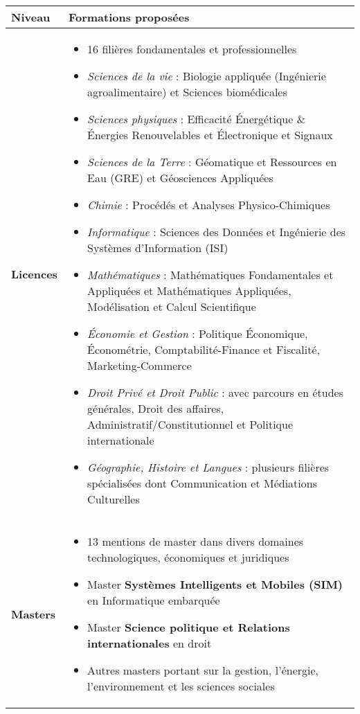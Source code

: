 \documentclass[french,12pt]{report} %
\newcommand{\headercell}[1]{\cellcolor{tableheader}\textbf{#1}}
\newcommand{\rowcol}{\rowcolor{tablerowalt}}
\begin{document}
\begin{table}[H]
\begin{mdframed}[style=tablestyle]
\centering
\begin{tabular}{p{3.5cm}p{10cm}}
\toprule
\headercell{Niveau} & \headercell{Formations proposées} \\ \midrule
\textbf{Licences} & 
\begin{itemize}\itemsep0em
    \item 16 filières fondamentales et professionnelles
    \item \textit{Sciences de la vie} : Biologie appliquée (Ingénierie agroalimentaire) et Sciences biomédicales
    \item \textit{Sciences physiques} : Efficacité Énergétique \& Énergies Renouvelables et Électronique et Signaux
    \item \textit{Sciences de la Terre} : Géomatique et Ressources en Eau (GRE) et Géosciences Appliquées
    \item \textit{Chimie} : Procédés et Analyses Physico-Chimiques
    \item \textit{Informatique} : Sciences des Données et Ingénierie des Systèmes d'Information (ISI)
    \item \textit{Mathématiques} : Mathématiques Fondamentales et Appliquées et Mathématiques Appliquées, Modélisation et Calcul Scientifique
    \item \textit{Économie et Gestion} : Politique Économique, Économétrie, Comptabilité-Finance et Fiscalité, Marketing-Commerce
    \item \textit{Droit Privé et Droit Public} : avec parcours en études générales, Droit des affaires, Administratif/Constitutionnel et Politique internationale
    \item \textit{Géographie, Histoire et Langues} : plusieurs filières spécialisées dont Communication et Médiations Culturelles
\end{itemize} \\ \midrule
\rowcol
\textbf{Masters} & 
\begin{itemize}\itemsep0em
    \item 13 mentions de master dans divers domaines technologiques, économiques et juridiques
    \item Master \textbf{Systèmes Intelligents et Mobiles (SIM)} en Informatique embarquée
    \item Master \textbf{Science politique et Relations internationales} en droit
    \item Autres masters portant sur la gestion, l'énergie, l'environnement et les sciences sociales

\end{itemize}
\end{tabular}
\end{mdframed}
\end{table}
\end{document}
